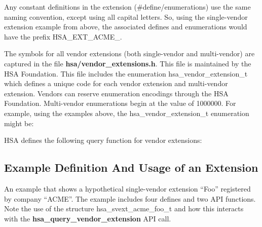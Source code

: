 \documentclass{book}
\newcommand{\reffun}[1]{\textbf{#1}}
\newcommand{\reftyp}[1]{#1}
\newcommand{\refenu}[1]{\reftyp{#1}}
\begin{document}
Any constant definitions in the extension (\#define/enumerations) use
the same naming convention, except using all capital letters. So,
using the single-vendor extension example from above, the associated
defines and enumerations would have the prefix
\refenu{HSA\_EXT\_ACME\_}.

The symbols for all vendor extensions (both single-vendor and
multi-vendor) are captured in the file {\bf hsa/vendor\_extensions.h}.
This file is maintained by the HSA Foundation.  This file includes
the enumeration \reftyp{hsa\_vendor\_extension\_t} which defines a
unique code for each vendor extension and multi-vendor extension.
Vendors can reserve enumeration encodings through the HSA
Foundation. Multi-vendor enumerations begin at the value of
1000000. For example, using the examples above, the
\reftyp{hsa\_vendor\_extension\_t} enumeration might be:



HSA defines the following query function for vendor extensions:



\subsection{Example Definition And Usage of an Extension}
An example that shows a hypothetical single-vendor extension ``Foo''
registered by company ``ACME''.  The example includes four defines
and two API functions.  Note the use of the structure
\reftyp{hsa\_svext\_acme\_foo\_t} and how this interacts with the
\reffun{hsa\_query\_vendor\_extension} API call.


\end{document}
